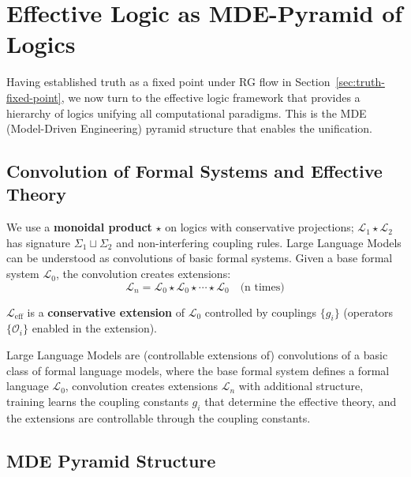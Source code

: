 \section{Effective Logic as MDE-Pyramid of Logics}
\label{sec:effective-logic}

Having established truth as a fixed point under RG flow in Section~\ref{sec:truth-fixed-point}, we now turn to the effective logic framework that provides a hierarchy of logics unifying all computational paradigms. This is the MDE (Model-Driven Engineering) pyramid structure that enables the unification.

\subsection{Convolution of Formal Systems and Effective Theory}

\begin{definition}
\label{def:convolution-formal}
We use a \textbf{monoidal product} $\star$ on logics with conservative projections; $\mathcal{L}_1\star\mathcal{L}_2$ has signature $\Sigma_1\sqcup\Sigma_2$ and non-interfering coupling rules. Large Language Models can be understood as convolutions of basic formal systems. Given a base formal system $\mathcal{L}_0$, the convolution creates extensions:
\[
\mathcal{L}_n = \mathcal{L}_0 \star \mathcal{L}_0 \star \cdots \star \mathcal{L}_0 \quad \text{(n times)}
\]
\end{definition}

\begin{definition}
\label{def:effective-computation}
$\mathcal{L}_{\text{eff}}$ is a \textbf{conservative extension} of $\mathcal{L}_0$ controlled by couplings $\{g_i\}$ (operators $\{\mathcal{O}_i\}$ enabled in the extension).
\end{definition}

\begin{theorem}
\label{thm:llm-formal}
Large Language Models are (controllable extensions of) convolutions of a basic class of formal language models, where the base formal system defines a formal language $\mathcal{L}_0$, convolution creates extensions $\mathcal{L}_n$ with additional structure, training learns the coupling constants $g_i$ that determine the effective theory, and the extensions are controllable through the coupling constants.
\end{theorem}

\subsection{MDE Pyramid Structure}

